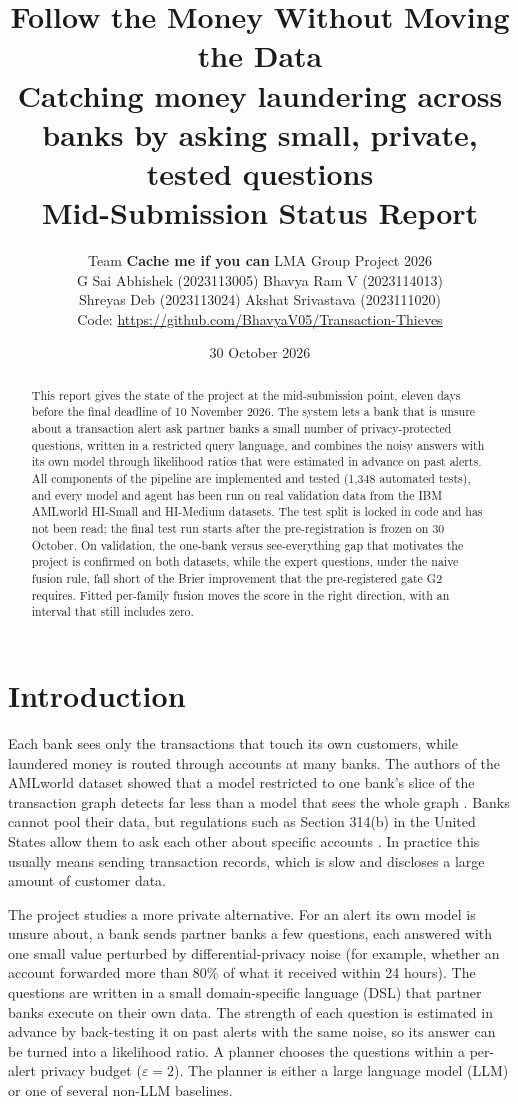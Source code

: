 \documentclass[11pt,a4paper]{article}
\title{\textbf{Follow the Money Without Moving the Data}\\[4pt]
\large Catching money laundering across banks by asking small, private, tested questions\\[2pt]
\large Mid-Submission Status Report}
\author{Team \textbf{Cache me if you can} \quad LMA Group Project 2026\\[6pt]
G Sai Abhishek (2023113005) \quad Bhavya Ram V (2023114013)\\
Shreyas Deb (2023113024) \quad Akshat Srivastava (2023111020)\\[6pt]
\small Code: \url{https://github.com/BhavyaV05/Transaction-Thieves}}
\date{30 October 2026}
\newcommand{\eps}{\varepsilon}
\begin{document}
\maketitle

\begin{abstract}
\noindent This report gives the state of the project at the mid-submission point, eleven days before the final deadline of 10 November 2026. The system lets a bank that is unsure about a transaction alert ask partner banks a small number of privacy-protected questions, written in a restricted query language, and combines the noisy answers with its own model through likelihood ratios that were estimated in advance on past alerts. All components of the pipeline are implemented and tested (1,348 automated tests), and every model and agent has been run on real validation data from the IBM AMLworld HI-Small and HI-Medium datasets. The test split is locked in code and has not been read; the final test run starts after the pre-registration is frozen on 30 October. On validation, the one-bank versus see-everything gap that motivates the project is confirmed on both datasets, while the expert questions, under the naive fusion rule, fall short of the Brier improvement that the pre-registered gate G2 requires. Fitted per-family fusion moves the score in the right direction, with an interval that still includes zero.
\end{abstract}

\section{Introduction}

Each bank sees only the transactions that touch its own customers, while laundered money is routed through accounts at many banks. The authors of the AMLworld dataset showed that a model restricted to one bank's slice of the transaction graph detects far less than a model that sees the whole graph \cite{altman2023}. Banks cannot pool their data, but regulations such as Section 314(b) in the United States allow them to ask each other about specific accounts \cite{cfr314b}. In practice this usually means sending transaction records, which is slow and discloses a large amount of customer data.

The project studies a more private alternative. For an alert its own model is unsure about, a bank sends partner banks a few questions, each answered with one small value perturbed by differential-privacy noise (for example, whether an account forwarded more than 80\% of what it received within 24 hours). The questions are written in a small domain-specific language (DSL) that partner banks execute on their own data. The strength of each question is estimated in advance by back-testing it on past alerts with the same noise, so its answer can be turned into a likelihood ratio. A planner chooses the questions within a per-alert privacy budget ($\eps = 2$). The planner is either a large language model (LLM) or one of several non-LLM baselines.
\end{document}
